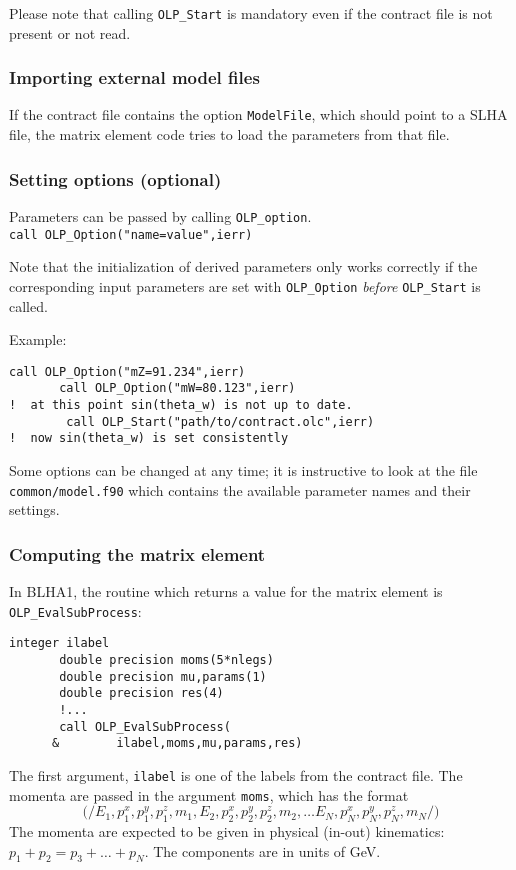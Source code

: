 Please note that calling \texttt{OLP\_Start} is mandatory even if the contract
file is not present or not read.

\subsubsection{Importing external model files}
If the contract file contains the option
\texttt{ModelFile}, which should point to a SLHA file,
the matrix element code tries to load the parameters from that file.

\subsubsection{Setting options (optional)}
Parameters can be passed by calling \texttt{OLP\_option}.\\
{\tt        call OLP\_Option("name=value",ierr)}

Note that the initialization of derived parameters only works correctly
if the corresponding input parameters are set with \texttt{OLP\_Option}
\emph{before} \texttt{OLP\_Start} is called.

Example:
\begin{lstlisting}[columns=flexibel]
       call OLP_Option("mZ=91.234",ierr)
       call OLP_Option("mW=80.123",ierr)
!  at this point sin(theta_w) is not up to date.
        call OLP_Start("path/to/contract.olc",ierr)
!  now sin(theta_w) is set consistently
\end{lstlisting}

Some options can be changed at any time; it is instructive to 
look at the file
\texttt{common/model.f90} which contains  the available
parameter names and  their settings.

\subsubsection{Computing the matrix element}

In BLHA1, the routine which returns a value for the matrix element is
\texttt{OLP\_EvalSubProcess}:
\begin{lstlisting}[columns=flexibel]
       integer ilabel
       double precision moms(5*nlegs)
       double precision mu,params(1)
       double precision res(4)
       !...
       call OLP_EvalSubProcess(
      &        ilabel,moms,mu,params,res)
\end{lstlisting}

The first argument, \texttt{ilabel} is one of the labels from the
contract file. The momenta are passed in the argument \texttt{moms},
which has the format
\begin{displaymath}
\mathtt{(/}
E_1, p^x_1, p^y_1, p^z_1, m_1,
E_2, p^x_2, p^y_2, p^z_2, m_2, \ldots
E_N, p^x_N, p^y_N, p^z_N, m_N
\mathtt{/)}
\end{displaymath}
The momenta are expected to be given in physical (in-out) 
kinematics: $p_1+p_2=p_3+\ldots+p_N$.
The components are in units of GeV.

